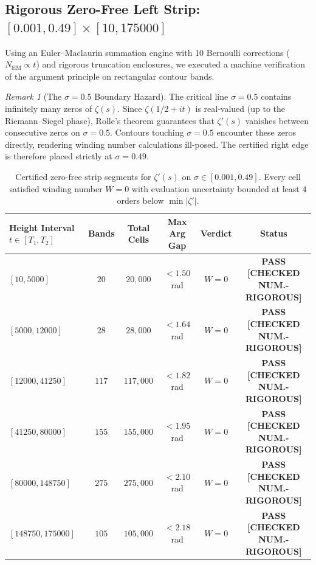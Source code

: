 \documentclass[11pt,a4paper]{article}
\theoremstyle{remark}
\newtheorem{remark}[theorem]{Remark}
\begin{document}
\subsection{Rigorous Zero-Free Left Strip: $[0.001, 0.49] \times [10, 175000]$}
Using an Euler--Maclaurin summation engine with 10 Bernoulli corrections ($N_{\text{EM}} \propto t$) and rigorous truncation enclosures, we executed a machine verification of the argument principle on rectangular contour bands.

\begin{remark}[The $\sigma = 0.5$ Boundary Hazard]
The critical line $\sigma = 0.5$ contains infinitely many zeros of $\zeta(s)$. Since $\zeta(1/2+it)$ is real-valued (up to the Riemann--Siegel phase), Rolle's theorem guarantees that $\zeta'(s)$ vanishes between consecutive zeros on $\sigma = 0.5$. Contours touching $\sigma = 0.5$ encounter these zeros directly, rendering winding number calculations ill-posed. The certified right edge is therefore placed strictly at $\sigma = 0.49$.
\end{remark}

\begin{table}[ht]
\centering
\small
\begin{tabular}{lccccc}
\toprule
Height Interval $t \in [T_1, T_2]$ & Bands & Total Cells & Max Arg Gap & Verdict & Status \\
\midrule
$[10, 5000]$ & $20$ & $20{,}000$ & $< 1.50$ rad & $W = 0$ & \textbf{PASS [CHECKED NUM.-RIGOROUS]} \\
$[5000, 12000]$ & $28$ & $28{,}000$ & $< 1.64$ rad & $W = 0$ & \textbf{PASS [CHECKED NUM.-RIGOROUS]} \\
$[12000, 41250]$ & $117$ & $117{,}000$ & $< 1.82$ rad & $W = 0$ & \textbf{PASS [CHECKED NUM.-RIGOROUS]} \\
$[41250, 80000]$ & $155$ & $155{,}000$ & $< 1.95$ rad & $W = 0$ & \textbf{PASS [CHECKED NUM.-RIGOROUS]} \\
$[80000, 148750]$ & $275$ & $275{,}000$ & $< 2.10$ rad & $W = 0$ & \textbf{PASS [CHECKED NUM.-RIGOROUS]} \\
$[148750, 175000]$ & $105$ & $105{,}000$ & $< 2.18$ rad & $W = 0$ & \textbf{PASS [CHECKED NUM.-RIGOROUS]} \\
\bottomrule
\end{tabular}
\caption{Certified zero-free strip segments for $\zeta'(s)$ on $\sigma \in [0.001, 0.49]$. Every cell satisfied winding number $W = 0$ with evaluation uncertainty bounded at least 4 orders below $\min|\zeta'|$.}
\label{tab:speiser_strip}
\end{table}
\end{document}
